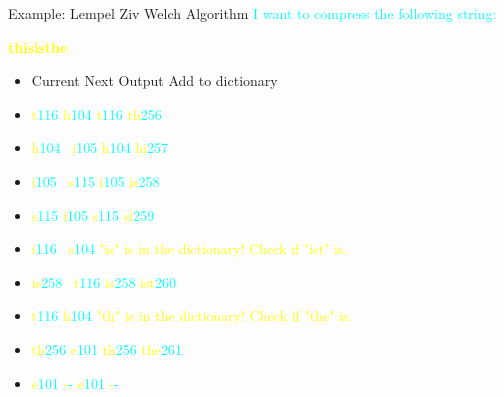 \documentclass{beamer}
\begin{document}
\begin{frame}{Example: Lempel Ziv Welch Algorithm}
\textcolor{cyan}{
I want to compress the following string: \\
}
\begin{center}
    \textcolor{yellow}{\textbf{\large thisisthe}}
\end{center}
\begin{itemize}
    \item <1-> \quad\quad Current \quad\quad\quad\quad Next \quad\quad\quad\quad Output \quad\quad\quad\quad Add to dictionary
    \item <1-> \quad\quad \textcolor{yellow}{t}\:\textcolor{cyan}{116} \quad\quad\quad\qquad\: \textcolor{yellow}{h}\:\textcolor{cyan}{104} \quad\quad\qquad \textcolor{yellow}{t}\:\textcolor{cyan}{116} \quad\quad\quad\qquad\: \textcolor{yellow}{th}\:\textcolor{cyan}{256}
    \item <2-> \quad\quad \textcolor{yellow}{h}\:\textcolor{cyan}{104} \quad\quad\quad\qquad\, \textcolor{yellow}{i}\:\textcolor{cyan}{105} \quad\quad\qquad \textcolor{yellow}{h}\:\textcolor{cyan}{104} \quad\quad\quad\qquad\: \textcolor{yellow}{hi}\:\textcolor{cyan}{257}
    \item <3-> \quad\quad \textcolor{yellow}{i}\:\textcolor{cyan}{105} \quad\quad\quad\qquad\;\, \textcolor{yellow}{s}\:\textcolor{cyan}{115} \quad\quad\qquad \textcolor{yellow}{i}\:\textcolor{cyan}{105} \quad\quad\quad\qquad\; \textcolor{yellow}{is}\:\textcolor{cyan}{258}
    \item <4-> \quad\quad \textcolor{yellow}{s}\:\textcolor{cyan}{115} \quad\quad\quad\qquad\; \textcolor{yellow}{i}\:\textcolor{cyan}{105} \quad\quad\qquad \textcolor{yellow}{s}\:\textcolor{cyan}{115} \quad\quad\quad\qquad\: \textcolor{yellow}{si}\:\textcolor{cyan}{259}
    \item <5-> \quad\quad \textcolor{yellow}{i}\:\textcolor{cyan}{116} \quad\quad\quad\qquad\;\, \textcolor{yellow}{s}\:\textcolor{cyan}{104} \quad\quad\qquad \textcolor{yellow}{"is" is in the dictionary! Check if "ist" is.}
    \item <6-> \quad\quad \textcolor{yellow}{is}\:\textcolor{cyan}{258} \quad\quad\quad\qquad\, \textcolor{yellow}{t}\:\textcolor{cyan}{116} \quad\quad\qquad \textcolor{yellow}{is}\:\textcolor{cyan}{258} \quad\quad\quad\qquad \textcolor{yellow}{ist}\:\textcolor{cyan}{260}
    \item <7-> \quad\quad \textcolor{yellow}{t}\:\textcolor{cyan}{116} \quad\quad\quad\qquad\; \textcolor{yellow}{h}\:\textcolor{cyan}{104} \quad\quad\qquad \textcolor{yellow}{"th" is in the dictionary! Check if "the" is.}    
    \item <8-> \quad\quad \textcolor{yellow}{th}\:\textcolor{cyan}{256} \quad\quad\quad\qquad \textcolor{yellow}{e}\:\textcolor{cyan}{101} \quad\quad\qquad \textcolor{yellow}{th}\:\textcolor{cyan}{256} \quad\quad\quad\qquad \textcolor{yellow}{the}\:\textcolor{cyan}{261}
    \item <9-> \quad\quad \textcolor{yellow}{e}\:\textcolor{cyan}{101} \quad\quad\quad\qquad\: \textcolor{yellow}{-}\:\textcolor{cyan}{-} \quad\qquad\qquad \textcolor{yellow}{e}\:\textcolor{cyan}{101} \quad\quad\quad\qquad\: \textcolor{yellow}{-}\:\textcolor{cyan}{-}
\end{itemize}
\end{frame}
\end{document}
